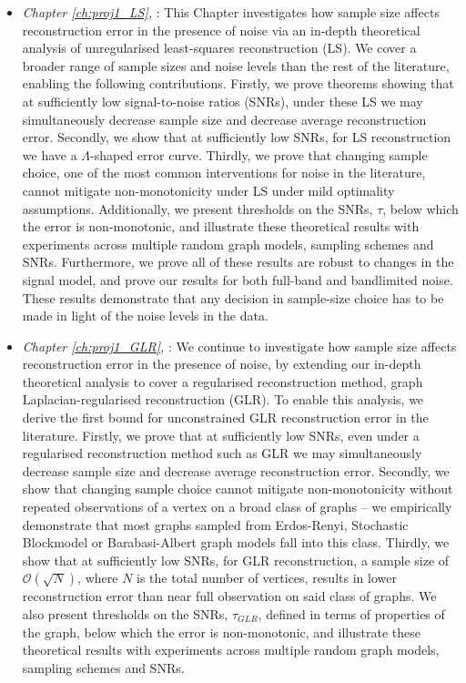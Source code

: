 \begin{itemize}
    \item \emph{Chapter \ref{ch:proj1_LS}, }:
    This Chapter investigates how sample size affects reconstruction error in the presence of noise via an in-depth theoretical analysis of unregularised least-squares reconstruction (LS). We cover a broader range of sample sizes and noise levels than the rest of the literature, enabling the following contributions. Firstly, we prove theorems showing that at sufficiently low signal-to-noise ratios (SNRs), under these LS we may simultaneously decrease sample size and decrease average reconstruction error. Secondly, we show that at sufficiently low SNRs, for LS reconstruction we have a $\Lambda$-shaped error curve. Thirdly, we prove that changing sample choice, one of the most common interventions for noise in the literature, cannot mitigate non-monotonicity under LS under mild optimality assumptions. 
    Additionally, we present thresholds on the SNRs, $\tau$, below which the error is non-monotonic, and illustrate these theoretical results with experiments across multiple random graph models, sampling schemes and SNRs. Furthermore, we prove all of these results are robust to changes in the signal model, and prove our results for both full-band and bandlimited noise. These results demonstrate that any decision in sample-size choice has to be made in light of the noise levels in the data. 
    \item \emph{Chapter \ref{ch:proj1_GLR}, }: We continue to investigate how sample size affects reconstruction error in the presence of noise, by extending our in-depth theoretical analysis to cover a regularised reconstruction method, graph Laplacian-regularised reconstruction (GLR). To enable this analysis, we derive the first bound for unconstrained GLR reconstruction error in the literature. Firstly, we prove that at sufficiently low SNRs, even under a regularised reconstruction method such as GLR we may simultaneously decrease sample size and decrease average reconstruction error. Secondly, we show that changing sample choice cannot mitigate non-monotonicity without repeated observations of a vertex on a broad class of graphs -- we empirically demonstrate that most graphs sampled from Erdos-Renyi, Stochastic Blockmodel or Barabasi-Albert graph models fall into this class.  Thirdly, we show that at sufficiently low SNRs, for GLR reconstruction, a sample size of $\mathcal{O}(\sqrt{N})$, where $N$ is the total number of vertices, results in lower reconstruction error than near full observation on said class of graphs. We also present thresholds on the SNRs, $\tau_{GLR}$, defined in terms of properties of the graph, below which the error is non-monotonic, and illustrate these theoretical results with experiments across multiple random graph models, sampling schemes and SNRs.

\end{itemize}
